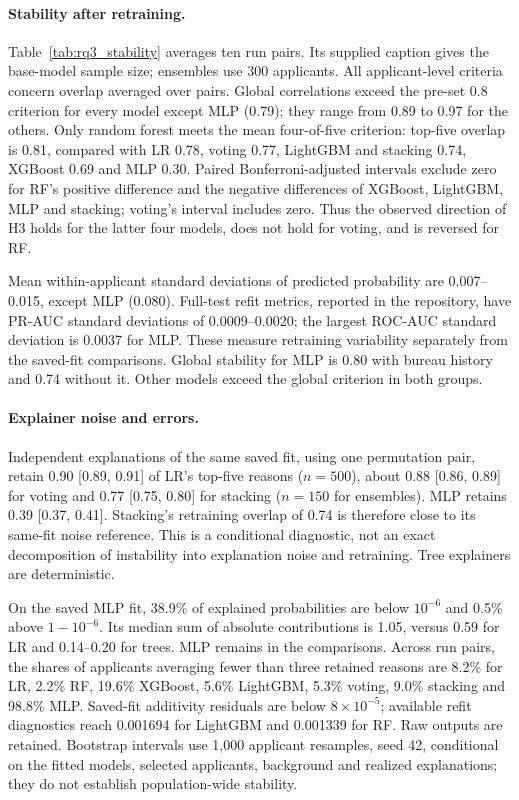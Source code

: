 

\paragraph{Stability after retraining.}
Table~\ref{tab:rq3_stability} averages ten run pairs. Its supplied caption gives the base-model sample size; ensembles use 300 applicants. All applicant-level criteria concern overlap averaged over pairs. Global correlations exceed the pre-set 0.8 criterion for every model except MLP (0.79); they range from 0.89 to 0.97 for the others. Only random forest meets the mean four-of-five criterion: top-five overlap is 0.81, compared with LR 0.78, voting 0.77, LightGBM and stacking 0.74, XGBoost 0.69 and MLP 0.30. Paired Bonferroni-adjusted intervals exclude zero for RF's positive difference and the negative differences of XGBoost, LightGBM, MLP and stacking; voting's interval includes zero. Thus the observed direction of H3 holds for the latter four models, does not hold for voting, and is reversed for RF.

Mean within-applicant standard deviations of predicted probability are 0.007--0.015, except MLP (0.080). Full-test refit metrics, reported in the repository, have PR-AUC standard deviations of 0.0009--0.0020; the largest ROC-AUC standard deviation is 0.0037 for MLP. These measure retraining variability separately from the saved-fit comparisons. Global stability for MLP is 0.80 with bureau history and 0.74 without it. Other models exceed the global criterion in both groups.

\paragraph{Explainer noise and errors.}
Independent explanations of the same saved fit, using one permutation pair, retain 0.90 [0.89, 0.91] of LR's top-five reasons ($n=500$), about 0.88 [0.86, 0.89] for voting and 0.77 [0.75, 0.80] for stacking ($n=150$ for ensembles). MLP retains 0.39 [0.37, 0.41]. Stacking's retraining overlap of 0.74 is therefore close to its same-fit noise reference. This is a conditional diagnostic, not an exact decomposition of instability into explanation noise and retraining. Tree explainers are deterministic.

On the saved MLP fit, 38.9\% of explained probabilities are below $10^{-6}$ and 0.5\% above $1-10^{-6}$. Its median sum of absolute contributions is 1.05, versus 0.59 for LR and 0.14--0.20 for trees. MLP remains in the comparisons. Across run pairs, the shares of applicants averaging fewer than three retained reasons are 8.2\% for LR, 2.2\% RF, 19.6\% XGBoost, 5.6\% LightGBM, 5.3\% voting, 9.0\% stacking and 98.8\% MLP. Saved-fit additivity residuals are below $8\times10^{-5}$; available refit diagnostics reach 0.001694 for LightGBM and 0.001339 for RF. Raw outputs are retained. Bootstrap intervals use 1,000 applicant resamples, seed 42, conditional on the fitted models, selected applicants, background and realized explanations; they do not establish population-wide stability.

